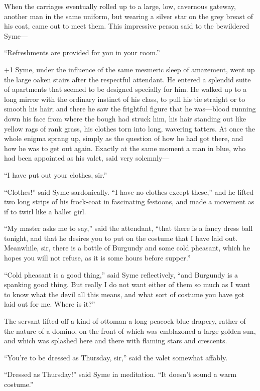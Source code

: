 When the carriages eventually rolled up to a large, low, cavernous gateway, another man in the same uniform, but wearing a silver star on the grey breast of his coat, came out to meet them. This impressive person said to the bewildered Syme⁠—

“Refreshments are provided for you in your room.”

\looseness+1
Syme, under the influence of the same mesmeric sleep of amazement, went up the large oaken stairs after the respectful attendant. He entered a splendid suite of apartments that seemed to be designed specially for him. He walked up to a long mirror with the ordinary instinct of his class, to pull his tie straight or to smooth his hair; and there he saw the frightful figure that he was⁠—blood running down his face from where the bough had struck him, his hair standing out like yellow rags of rank grass, his clothes torn into long, wavering tatters. At once the whole enigma sprang up, simply as the question of how he had got there, and how he was to get out again. Exactly at the same moment a man in blue, who had been appointed as his valet, said very solemnly⁠—

“I have put out your clothes, sir.”

“Clothes!” said Syme sardonically. “I have no clothes except these,” and he lifted two long strips of his frock-coat in fascinating festoons, and made a movement as if to twirl like a ballet girl.

“My master asks me to say,” said the attendant, “that there is a fancy dress ball tonight, and that he desires you to put on the costume that I have laid out. Meanwhile, sir, there is a bottle of Burgundy and some cold pheasant, which he hopes you will not refuse, as it is some hours before supper.”

“Cold pheasant is a good thing,” said Syme reflectively, “and Burgundy is a spanking good thing. But really I do not want either of them so much as I want to know what the devil all this means, and what sort of costume you have got laid out for me. Where is it?”

The servant lifted off a kind of ottoman a long peacock-blue drapery, rather of the nature of a domino, on the front of which was emblazoned a large golden sun, and which was splashed here and there with flaming stars and crescents.

“You’re to be dressed as Thursday, sir,” said the valet somewhat affably.

“Dressed as Thursday!” said Syme in meditation. “It doesn’t sound a warm costume.”

